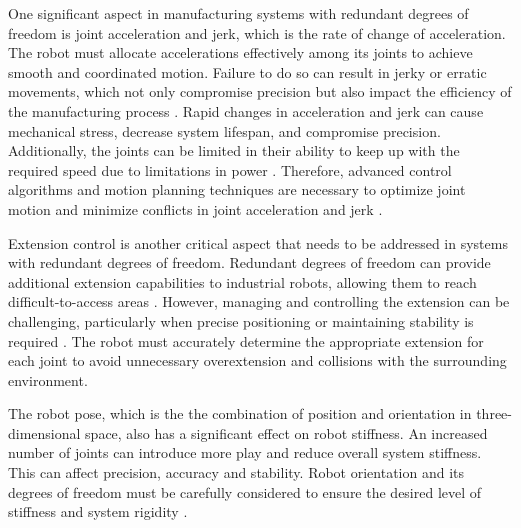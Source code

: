 






One significant aspect in manufacturing systems with redundant degrees of freedom is joint acceleration and jerk, which is the rate of change of acceleration. The robot must allocate accelerations effectively among its joints to achieve smooth and coordinated motion. Failure to do so can result in jerky or erratic movements, which not only compromise precision but also impact the efficiency of the manufacturing process \cite{Duong.2021}. Rapid changes in acceleration and jerk can cause mechanical stress, decrease system lifespan, and compromise precision. Additionally, the joints can be limited in their ability to keep up with the required speed due to limitations in power \cite{Staff.1988}. Therefore, advanced control algorithms and motion planning techniques are necessary to optimize joint motion and minimize conflicts in joint acceleration and jerk \cite{Duong.2021}.

Extension control is another critical aspect that needs to be addressed in systems with redundant degrees of freedom. Redundant degrees of freedom can provide additional extension capabilities to industrial robots, allowing them to reach difficult-to-access areas \cite{Duong.2021}. However, managing and controlling the extension can be challenging, particularly when precise positioning or maintaining stability is required \cite{Lin.2022}.
The robot must accurately determine the appropriate extension for each joint to avoid unnecessary overextension and collisions with the surrounding environment.

The robot pose, which is the the combination of position and orientation in three-dimensional space, also has a significant effect on robot stiffness. An increased number of joints can introduce more play and reduce overall system stiffness. This can affect precision, accuracy and stability. Robot orientation and its degrees of freedom must be carefully considered to ensure the desired level of stiffness and system rigidity \cite{Liu.2022, Shi.2021}.


